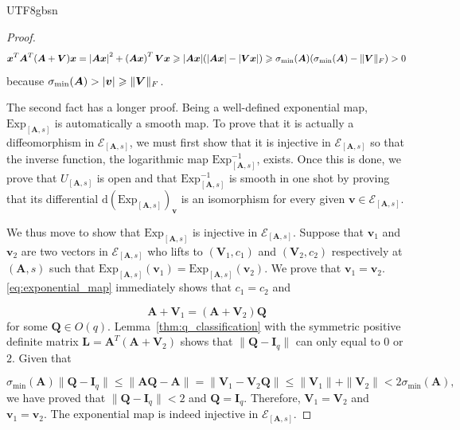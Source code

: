 \documentclass[12pt]{report}
\newcommand{\bracket}[1]{\left ( #1 \right )}
\theoremstyle{plain}
\theoremstyle{definition}
\begin{document}
\begin{CJK*}{UTF8}{gbsn}
\begin{proof}
\begin{equation*}
  \bm{x}^T \bm{A}^T(\bm{A}+\bm{V}) \bm{x}
  = \abs{\bm{A}\bm{x}}^2 + \bracket{\bm{A}\bm{x}}^T \bm{V}\bm{x}
  \geqslant \abs{\bm{A}\bm{x}}(\abs{\bm{A}\bm{x}}-\abs{\bm{V}\bm{x}})
  \geqslant \sigma_{\min}(\bm{A})(\sigma_{\min}(\bm{A})-	\|\bm{V}	\|_F) > 0
\end{equation*}
because $\sigma_{\min}(\bm{A}) >	\abs{\bm{v}} \geqslant \|\bm{V}\|_F$.

The second fact has a longer proof.
Being a well-defined exponential map,
$\text{Exp}_{[\bm{A},s]}$ is automatically a smooth map.
To prove that it is actually a diffeomorphism 
in $\mathcal{E}_{[\bm{A},s]}$,
we must first show that it is injective in 
$\mathcal{E}_{[\bm{A},s]}$ so that 
the inverse function, the logarithmic map $\text{Exp}^{-1}_{[\bm{A},s]}$,
exists. Once this is done, 
we prove that $U_{[\bm{A},s]}$ is open and 
that $\text{Exp}^{-1}_{[\bm{A},s]}$ 
is smooth in one shot 
by proving that its differential
$\mathrm{d} \bracket{\text{Exp}_{[\bm{A},s]}}_{\bm{v}}$
is an isomorphism for every given $\bm{v} \in \mathcal{E}_{[\bm{A},s]}$.

We thus move to show that $\text{Exp}_{[\bm{A},s]}$
is injective in $\mathcal{E}_{[\bm{A},s]}$.
Suppose that $\bm{v}_1$ and $\bm{v}_2$
are two vectors in $\mathcal{E}_{[\bm{A},s]}$
who lifts to $(\bm{V}_1,c_1)$ and $(\bm{V}_2,c_2)$
respectively 
at $(\bm{A},s)$
such that $\text{Exp}_{[\bm{A},s]}(\bm{v}_1) = \text{Exp}_{[\bm{A},s]}(\bm{v}_2)$.
We prove that $\bm{v}_1=\bm{v}_2$.
\eqref{eq:exponential_map} immediately
shows that $c_1=c_2$ and 

\begin{equation*}
  \bm{A} + \bm{V}_1 = (\bm{A} + \bm{V}_2)\bm{Q}
\end{equation*}
for some $\bm{Q} \in O(q)$.
Lemma~\ref{thm:q_classification}
with the symmetric positive definite matrix $\bm{L} = \bm{A}^T (\bm{A} + \bm{V}_2)$
shows that $\|\bm{Q} - \bm{I}_q\|$ can only equal to $0$ or $2$.
Given that

\begin{equation*}
  \sigma_{\min}(\bm{A})\|\bm{Q} - \bm{I}_q\| \leqslant 
  \|\bm{A}\bm{Q} - \bm{A}\| = \|\bm{V}_1 - \bm{V}_2\bm{Q}\|
  \leqslant \|\bm{V}_1\| + \| \bm{V}_2\| < 2\sigma_{\min}(\bm{A}),
\end{equation*}
we have proved that $\|\bm{Q} - \bm{I}_q\| < 2$ and $\bm{Q} = \bm{I}_q$.
Therefore, $\bm{V}_1 =\bm{V}_2$ and $\bm{v}_1=\bm{v}_2$.
The exponential map is indeed injective in $\mathcal{E}_{[\bm{A},s]}$.


\end{proof}
\end{CJK*}
\end{document}
